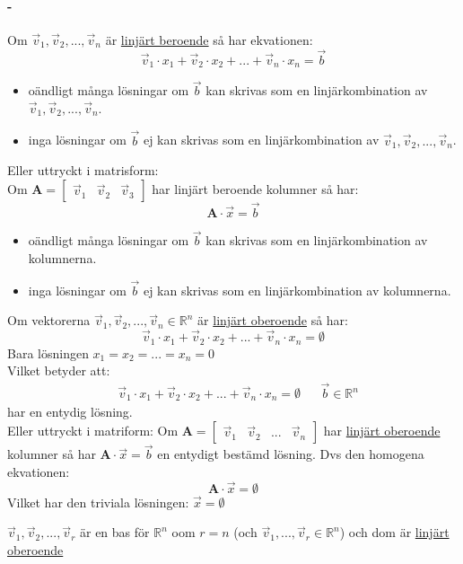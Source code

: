 \paragraph{-} %
\label{par:_1}
Om $\vec{v}_1, \vec{v}_2,..., \vec{v}_n$ är \underline{linjärt beroende} så har ekvationen:
\[
\vec{v}_1 \cdot x_1 + \vec{v}_2 \cdot x_2 + ... + \vec{v}_n \cdot x_n = \vec{b}
\]
\begin{itemize}
	\item oändligt många lösningar om $\vec{b}$ kan skrivas som en linjärkombination av $\vec{v}_1, \vec{v}_2,..., \vec{v}_n$.
	\item inga lösningar om $\vec{b}$ ej kan skrivas som en linjärkombination av $\vec{v}_1, \vec{v}_2,..., \vec{v}_n$.
\end{itemize}
Eller uttryckt i matrisform:\\
Om $\mathbf{A} = \begin{bmatrix} \vec{v}_1&\vec{v}_2&\vec{v}_3 \end{bmatrix}$ har linjärt beroende kolumner så har:
\[
\mathbf{A} \cdot \vec{x} = \vec{b}
\]
\begin{itemize}
	\item oändligt många lösningar om $\vec{b}$ kan skrivas som en linjärkombination av kolumnerna.
	\item inga lösningar om $\vec{b}$ ej kan skrivas som en linjärkombination av kolumnerna.
\end{itemize}
Om vektorerna $\vec{v}_1, \vec{v}_2,..., \vec{v}_n \in \mathbb{R}^n$ är \underline{linjärt oberoende} så har:
\[
\vec{v}_1 \cdot x_1 + \vec{v}_2 \cdot x_2 +...+ \vec{v}_n \cdot x_n = \emptyset
\]
Bara lösningen $x_1 = x_2 = ... = x_n = 0$\\
Vilket betyder att:
\begin{align*}
&\vec{v}_1 \cdot x_1 + \vec{v}_2 \cdot x_2 +...+ \vec{v}_n \cdot x_n = \emptyset
&&\vec{b} \in \mathbb{R}^n
\end{align*}
har en entydig lösning.\\
Eller uttryckt i matriform:
Om $\mathbf{A} = \begin{bmatrix} \vec{v}_1 & \vec{v}_2 &...&\vec{v}_n \end{bmatrix}$ har \underline{linjärt oberoende} kolumner så har $\mathbf{A} \cdot \vec{x} = \vec{b}$ en entydigt bestämd lösning. Dvs den homogena ekvationen:
\[
\mathbf{A} \cdot \vec{x} = \emptyset
\]
Vilket har den triviala lösningen: $\vec{x} = \emptyset$
\newpage
\begin{sats}
	$\vec{v}_1, \vec{v}_2,..., \vec{v}_r$ är en bas för $\mathbb{R}^n$ oom $r = n$ (och $\vec{v}_1,..., \vec{v}_r \in \mathbb{R}^n$) och dom är \underline{linjärt oberoende}
\end{sats}
